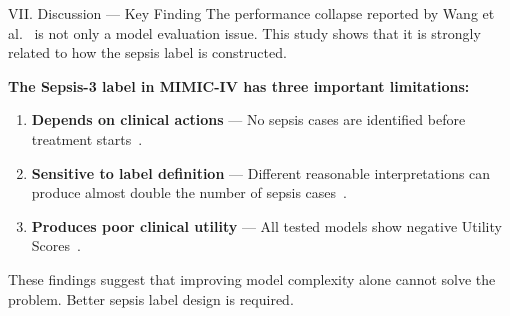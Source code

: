 \documentclass[aspectratio=169,10pt]{beamer}
\begin{document}
\begin{frame}{VII. Discussion --- Key Finding}
The performance collapse reported by Wang et al.~\cite{wang2025srpm} is not only a model evaluation issue. This study shows that it is strongly related to how the sepsis label is constructed.

\vspace{6pt}
\textbf{The Sepsis-3 label in MIMIC-IV has three important limitations:}
\begin{enumerate}
  \item \textbf{Depends on clinical actions} --- No sepsis cases are identified before treatment starts~\cite{kamran2024evaluation}.
  \item \textbf{Sensitive to label definition} --- Different reasonable interpretations can produce almost double the number of sepsis cases~\cite{cohen2024subtle}.
  \item \textbf{Produces poor clinical utility} --- All tested models show negative Utility Scores~\cite{wang2025srpm}.
\end{enumerate}

\vspace{6pt}
\begin{alertblock}{}
  \centering These findings suggest that improving model complexity alone cannot solve the problem. Better sepsis label design is required.
\end{alertblock}
\end{frame}
\end{document}
